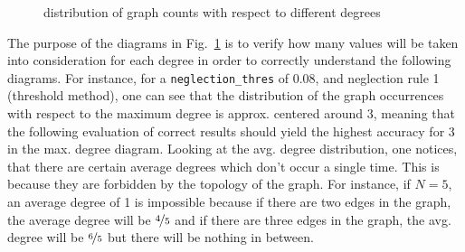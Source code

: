 \documentclass{article}
\begin{document}
	\begin{figure}[h]
	\caption{distribution of graph counts with respect to different degrees}
	\label{fig:degrees}
	\end{figure}
	The purpose of the diagrams in Fig.~\ref{fig:degrees} is to verify how many values will be taken into consideration for each degree in order to correctly understand the following diagrams. For instance, for a {\tt neglection\_thres} of 0.08, and neglection rule 1 (threshold method), one can see that the distribution of the graph occurrences with respect to the maximum degree is approx. centered around 3, meaning that the following evaluation of correct results should yield the highest accuracy for 3 in the max. degree diagram.
	Looking at the avg. degree distribution, one notices, that there are certain average degrees which don't occur a single time. This is because they are forbidden by the topology of the graph. For instance, if $N=5$, an average degree of 1 is impossible because if there are two edges in the graph, the average degree will be $\nicefrac{4}{5}$ and if there are three edges in the graph, the avg. degree will be $\nicefrac{6}{5}$ but there will be nothing in between. 
	
\end{document}
